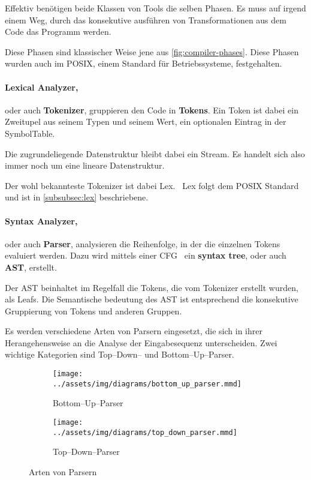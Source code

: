Effektiv benötigen beide Klassen von Tools die selben Phasen.
Es muss auf irgend einem Weg, durch das konsekutive ausführen von Transformationen aus dem Code das Programm werden.

Diese Phasen sind klassischer Weise jene aus \autoref{fig:compiler-phases}.
Diese Phasen wurden auch im \ac{POSIX}, einem Standard für Betriebssysteme, festgehalten.~\autocite{ieee-sa-1993}

\paragraph{Lexical Analyzer,} oder auch \textbf{Tokenizer}, gruppieren den Code in \textbf{Tokens}.
Ein Token ist dabei ein Zweitupel aus seinem Typen und seinem Wert, ein optionalen Eintrag in der SymbolTable.

Die zugrundeliegende Datenstruktur bleibt dabei ein Stream.
Es handelt sich also immer noch um eine lineare Datenstruktur.

Der wohl bekannteste Tokenizer ist dabei Lex.~\autocite{wikipedia-contributors-2024G}
Lex folgt dem \ac{POSIX} Standard und ist in \autoref{subsubsec:lex} beschriebene.

\paragraph{Syntax Analyzer,} oder auch \textbf{Parser}, analysieren die Reihenfolge, in der die einzelnen Tokens evaluiert werden.
Dazu wird mittels einer \ac{CFG}~\autocite{wikipedia-contributors-2024H} ein \textbf{syntax tree}, oder auch \textbf{\ac{AST}}, erstellt.

Der \ac{AST} beinhaltet im Regelfall die Tokens, die vom Tokenizer erstellt wurden, als Leafs.
Die Semantische bedeutung des \ac{AST} ist entsprechend die konsekutive Gruppierung von Tokens und anderen Gruppen.

Es werden verschiedene Arten von Parsern eingesetzt, die sich in ihrer Herangehensweise an die Analyse der Eingabesequenz unterscheiden.
Zwei wichtige Kategorien sind Top--Down-- und Bottom--Up--Parser.
\begin{figure}[ht]
    \begin{subfigure}[c]{0.5\textwidth}
        \begin{center}
            \texttt{[image: ../assets/img/diagrams/bottom\_up\_parser.mmd]}
        \end{center}
        \caption{Bottom--Up--Parser}
        \label{subfig:bottom-up-parser}
    \end{subfigure}
    \begin{subfigure}[c]{0.5\textwidth}
        \begin{center}
            \texttt{[image: ../assets/img/diagrams/top\_down\_parser.mmd]}
        \end{center}
        \caption{Top--Down--Parser}
        \label{subfig:top-down-parser}
    \end{subfigure}
    \caption{Arten von Parsern}
    \label{fig:parser-types}
\end{figure}

